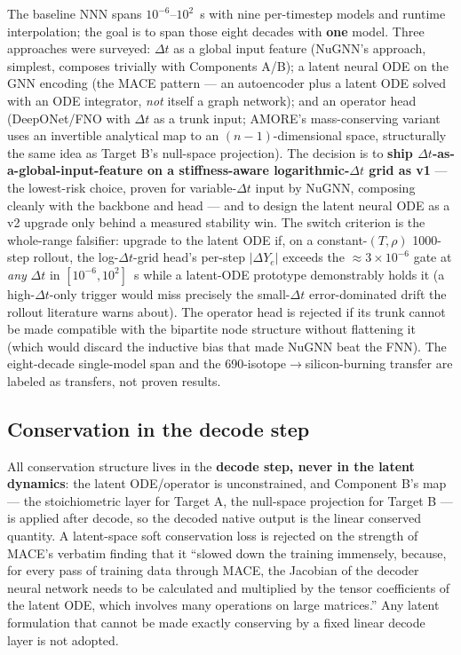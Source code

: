 \documentclass[11pt]{article}
\newcommand{\dYe}{\Delta Y_{e}}
\begin{document}
The baseline NNN spans $10^{-6}$--$10^{2}$~s with nine per-timestep models and runtime interpolation; the goal is to span those eight decades with \textbf{one} model. Three approaches were surveyed: $\Delta t$ as a global input feature (NuGNN's approach, simplest, composes trivially with Components A/B); a latent neural ODE on the GNN encoding (the MACE pattern --- an autoencoder plus a latent ODE solved with an ODE integrator, \emph{not} itself a graph network); and an operator head (DeepONet/FNO with $\Delta t$ as a trunk input; AMORE's mass-conserving variant uses an invertible analytical map to an $(n{-}1)$-dimensional space, structurally the same idea as Target B's null-space projection). The decision is to \textbf{ship $\Delta t$-as-a-global-input-feature on a stiffness-aware logarithmic-$\Delta t$ grid as v1} --- the lowest-risk choice, proven for variable-$\Delta t$ input by NuGNN, composing cleanly with the backbone and head --- and to design the latent neural ODE as a v2 upgrade only behind a measured stability win. The switch criterion is the whole-range falsifier: upgrade to the latent ODE if, on a constant-$(T,\rho)$ 1000-step rollout, the log-$\Delta t$-grid head's per-step $|\dYe|$ exceeds the $\approx 3\times10^{-6}$ gate at \emph{any} $\Delta t$ in $[10^{-6}, 10^{2}]$~s while a latent-ODE prototype demonstrably holds it (a high-$\Delta t$-only trigger would miss precisely the small-$\Delta t$ error-dominated drift the rollout literature warns about). The operator head is rejected if its trunk cannot be made compatible with the bipartite node structure without flattening it (which would discard the inductive bias that made NuGNN beat the FNN). The eight-decade single-model span and the 690-isotope$\to$silicon-burning transfer are labeled as transfers, not proven results.

\subsection{Conservation in the decode step}

All conservation structure lives in the \textbf{decode step, never in the latent dynamics}: the latent ODE/operator is unconstrained, and Component B's map --- the stoichiometric layer for Target A, the null-space projection for Target B --- is applied after decode, so the decoded native output is the linear conserved quantity. A latent-space soft conservation loss is rejected on the strength of MACE's verbatim finding that it ``slowed down the training immensely, because, for every pass of training data through MACE, the Jacobian of the decoder neural network needs to be calculated and multiplied by the tensor coefficients of the latent ODE, which involves many operations on large matrices.'' Any latent formulation that cannot be made exactly conserving by a fixed linear decode layer is not adopted.
\end{document}
